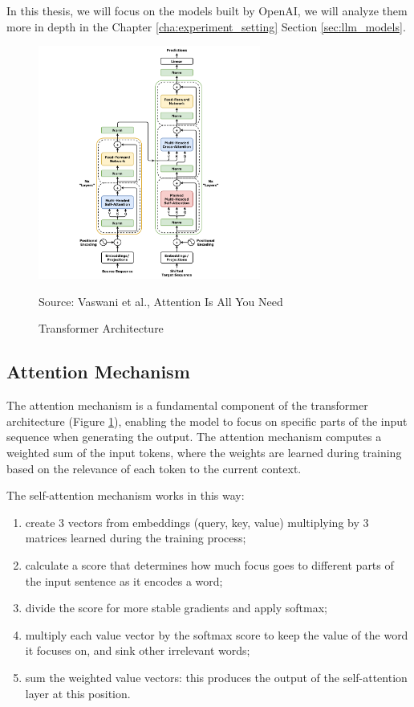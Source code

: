 In this thesis, we will focus on the models built by OpenAI, we will analyze
them more in depth in the Chapter \ref{cha:experiment_setting} Section
\ref{sec:llm_models}.

\begin{figure}[h!]
  \centering
  \includegraphics[width=0.65\textwidth]{images/transformer_architecture.png}
  \caption{Transformer Architecture}
  { Source: Vaswani et al., Attention Is All You Need \cite{vaswani2023attentionneed}}
  \label{fig:transformer_architecture}
\end{figure}

\subsection{Attention Mechanism}
\label{sub:attention_mechanism}

The attention mechanism is a fundamental component of the transformer
architecture (Figure \ref{fig:transformer_architecture}), enabling the model to focus
on specific parts of the input sequence when generating the output. The
attention mechanism computes a weighted sum of the input tokens, where the weights
are learned during training based on the relevance of each token to the current context.

The self-attention mechanism works in this way:
\begin{enumerate}
  \item create 3 vectors from embeddings (query, key, value) multiplying by 3 matrices
    learned during the training process;

  \item calculate a score that determines how much focus goes to different parts
    of the input sentence as it encodes a word;

  \item divide the score for more stable gradients and apply softmax;

  \item multiply each value vector by the softmax score to keep the value of the
    word it focuses on, and sink other irrelevant words;

  \item sum the weighted value vectors: this produces the output of the self-attention
    layer at this position.
\end{enumerate}

